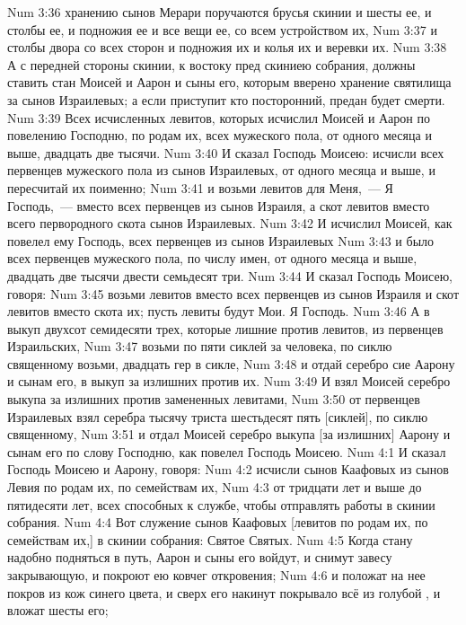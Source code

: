 \vs Num 3:36 хранению сынов Мерари поручаются брусья скинии и шесты ее, и столбы ее, и подножия ее и все вещи ее, со всем устройством их,
\vs Num 3:37 и столбы двора со всех сторон и подножия их и колья их и веревки их.
\vs Num 3:38 А с передней стороны скинии, к востоку пред скиниею собрания, должны ставить стан Моисей и Аарон и сыны его, которым вверено хранение святилища за сынов Израилевых; а если приступит кто посторонний, предан будет смерти.
\vs Num 3:39 Всех исчисленных левитов, которых исчислил Моисей и Аарон по повелению Господню, по родам их, всех мужеского пола, от одного месяца и выше, двадцать две тысячи.
\rsbpar\vs Num 3:40 И сказал Господь Моисею: исчисли всех первенцев мужеского пола из сынов Израилевых, от одного месяца и выше, и пересчитай их поименно;
\vs Num 3:41 и возьми левитов для Меня,~--- Я Господь,~--- вместо всех первенцев из сынов Израиля, а скот левитов вместо всего первородного скота сынов Израилевых.
\vs Num 3:42 И исчислил Моисей, как повелел ему Господь, всех первенцев из сынов Израилевых
\vs Num 3:43 и было всех первенцев мужеского пола, по числу имен, от одного месяца и выше, двадцать две тысячи двести семьдесят три.
\rsbpar\vs Num 3:44 И сказал Господь Моисею, говоря:
\vs Num 3:45 возьми левитов вместо всех первенцев из сынов Израиля и скот левитов вместо скота их; пусть левиты будут Мои. Я Господь.
\vs Num 3:46 А в выкуп двухсот семидесяти трех, которые лишние против  левитов, из первенцев Израильских,
\vs Num 3:47 возьми по пяти сиклей за человека, по сиклю священному возьми, двадцать гер в сикле,
\vs Num 3:48 и отдай серебро сие Аарону и сынам его, в выкуп за излишних против  их.
\vs Num 3:49 И взял Моисей серебро выкупа за излишних против  замененных левитами,
\vs Num 3:50 от первенцев Израилевых взял серебра тысячу триста шестьдесят пять [сиклей], по сиклю священному,
\vs Num 3:51 и отдал Моисей серебро выкупа [за излишних] Аарону и сынам его по слову Господню, как повелел Господь Моисею.
\vs Num 4:1 И сказал Господь Моисею и Аарону, говоря:
\vs Num 4:2 исчисли сынов Каафовых из сынов Левия по родам их, по семействам их,
\vs Num 4:3 от тридцати лет и выше до пятидесяти лет, всех способных к службе, чтобы отправлять работы в скинии собрания.
\vs Num 4:4 Вот служение сынов Каафовых [левитов по родам их, по семействам их,] в скинии собрания:  Святое Святых.
\vs Num 4:5 Когда стану надобно подняться в путь, Аарон и сыны его войдут, и снимут завесу закрывающую, и покроют ею ковчег откровения;
\vs Num 4:6 и положат на нее покров из кож синего цвета, и сверх его накинут покрывало всё из голубой , и вложат шесты его;
